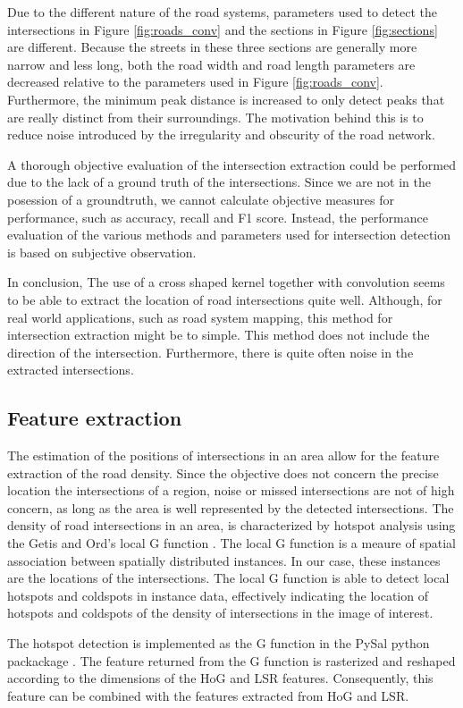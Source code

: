 Due to the different nature of the road systems, parameters used to detect the intersections in Figure \ref{fig:roads_conv} and the sections in Figure \ref{fig:sections} are different. Because the streets in these three sections are generally more narrow and less long, both the road width and road length parameters are decreased relative to the parameters used in Figure \ref{fig:roads_conv}. Furthermore, the minimum peak distance is increased to only detect peaks that are really distinct from their surroundings. The motivation behind this is to reduce noise introduced by the irregularity and obscurity of the road network.

A thorough objective evaluation of the intersection extraction could be performed due to the lack of a ground truth of the intersections. Since we are not in the posession of a groundtruth, we cannot calculate objective measures for performance, such as accuracy, recall and F1 score. Instead, the performance evaluation of the various methods and parameters used for intersection detection is based on subjective observation.

In conclusion, The use of a cross shaped kernel together with convolution seems to be able to extract the location of road intersections quite well. Although, for real world applications, such as road system mapping, this method for intersection extraction might be to simple. This method does not include the direction of the intersection. Furthermore, there is quite often noise in the extracted intersections.




\subsection{Feature extraction}

The estimation of the positions of intersections in an area allow for the
feature extraction of the road density. Since the objective does not concern the
precise location the intersections of a region, noise or missed intersections are not of high concern, as long as the area is well represented by the detected intersections. The density of road intersections in an area, is characterized by hotspot analysis using the Getis and Ord's local G function \cite{getis1992analysis}. The local G function is a meaure of spatial association between spatially distributed instances. In our case, these instances are the locations of the intersections. The local G function is able to detect local hotspots and coldspots in instance data, effectively indicating the location of hotspots and coldspots of the density of intersections in the image of interest.

The hotspot detection is implemented as the G function in the PySal python packackage \cite{rey2010pysal}. The feature returned from the G function is rasterized and reshaped according to the dimensions of the HoG and LSR features. Consequently, this feature can be combined with the features extracted from HoG and LSR.




